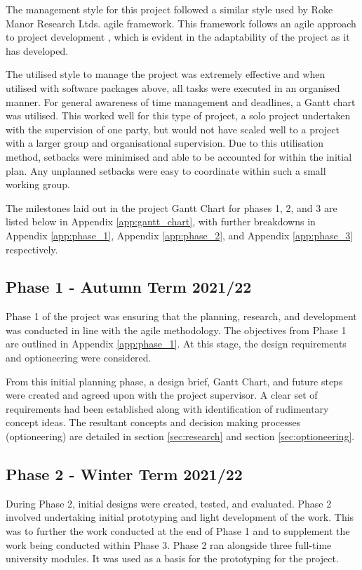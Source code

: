 \documentclass [11pt]{article}
\begin{document}
The management style for this project followed a similar style used by Roke Manor Research Ltds. agile framework. This framework follows an agile approach to project development \cite{agile_development}, which is evident in the adaptability of the project as it has developed.  

The utilised style to manage the project was extremely effective and when utilised with software packages above, all tasks were executed in an organised manner. For general awareness of time management and deadlines, a Gantt chart was utilised. This worked well for this type of project, a solo project undertaken with the supervision of one party, but would not have scaled well to a project with a larger group and organisational supervision. Due to this utilisation method, setbacks were minimised and able to be accounted for within the initial plan. Any unplanned setbacks were easy to coordinate within such a small working group. 

The milestones laid out in the project Gantt Chart for phases 1, 2, and 3 are listed below in Appendix \ref{app:gantt_chart}, with further breakdowns in Appendix \ref{app:phase_1}, Appendix \ref{app:phase_2}, and Appendix \ref{app:phase_3} respectively. 

\subsection{Phase 1 - Autumn Term 2021/22}\label{sec:phase_1}

Phase 1 of the project was ensuring that the planning, research, and development was conducted in line with the agile methodology. The objectives from Phase 1 are outlined in Appendix \ref{app:phase_1}. At this stage, the design requirements and optioneering were considered.  

From this initial planning phase, a design brief, Gantt Chart, and future steps were created and agreed upon with the project supervisor. A clear set of requirements had been established along with identification of rudimentary concept ideas. The resultant concepts and decision making processes (optioneering) are detailed in section \ref{sec:research} and section \ref{sec:optioneering}.  

\subsection{Phase 2 - Winter Term 2021/22}\label{sec:phase_2}

During Phase 2, initial designs were created, tested, and evaluated. Phase 2 involved undertaking initial prototyping and light development of the work. This was to further the work conducted at the end of Phase 1 and to supplement the work being conducted within Phase 3. Phase 2 ran alongside three full-time university modules. It was used as a basis for the prototyping for the project.  
\end{document}
